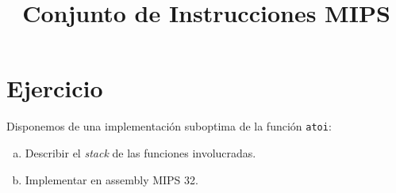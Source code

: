 \documentclass[a4paper]{article}
\title{Conjunto de Instrucciones MIPS}
\date{}
\begin{document}
\maketitle
\section{Ejercicio}
Disponemos de una implementación suboptima de la función \texttt{atoi}:




\begin{enumerate}[a.]
\item Describir el \textit{stack} de las funciones involucradas.
\item Implementar en assembly MIPS 32.
\end{enumerate}
\end{document}
